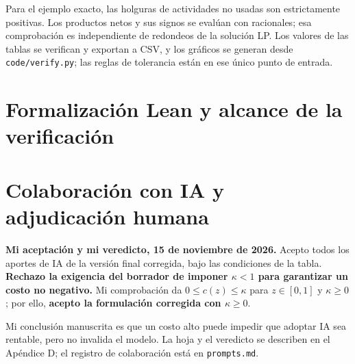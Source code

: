 \documentclass[11pt]{article}
\begin{document}
Para el ejemplo exacto, las holguras de actividades no usadas son estrictamente positivas. Los productos netos y sus signos se evalúan con racionales; esa comprobación es independiente de redondeos de la solución LP. Los valores de las tablas se verifican y exportan a CSV, y los gráficos se generan desde \texttt{code/verify.py}; las reglas de tolerancia están en ese único punto de entrada.
\newpage
\section{Formalización Lean y alcance de la verificación}\label{app:lean}

\newpage
\section{Colaboración con IA y adjudicación humana}
\textbf{Mi aceptación y mi veredicto, 15 de noviembre de 2026.} Acepto todos los aportes de IA de la versión final corregida, bajo las condiciones de la tabla. \textbf{Rechazo la exigencia del borrador de imponer $\kappa<1$ para garantizar un costo no negativo.} Mi comprobación da $0\leq c(z)\leq\kappa$ para $z\in[0,1]$ y $\kappa\geq0$; por ello, \textbf{acepto la formulación corregida con $\kappa\geq0$}.

Mi conclusión manuscrita es que un costo alto puede impedir que adoptar IA sea rentable, pero no invalida el modelo. La hoja y el veredicto se describen en el Apéndice D; el registro de colaboración está en \texttt{prompts.md}.
\end{document}

